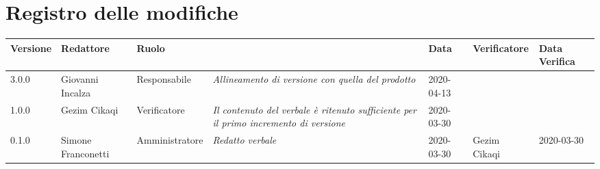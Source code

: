 \section*{Registro delle modifiche}
\renewcommand{\arraystretch}{1.8}

  \setlength\LTleft{-1.7cm}
  \begin{longtable}{|p{1.7cm}|p{2cm}|p{2.5cm}|p{3cm}|p{1.7cm}|p{2cm}|p{2.3cm}|}
    \hline

    \rowcolor{header}
    \textbf{Versione} & \textbf{Redattore} & \textbf{Ruolo} & \centering{\textbf{Descrizione}} & \textbf{Data} & \textbf{Verificatore} & \textbf{Data Verifica}\\

    \hline
    3.0.0 & Giovanni Incalza & Responsabile & \small{\textit{Allineamento di versione con quella del prodotto}} & 2020-04-13 & &\\
    1.0.0 & Gezim Cikaqi & Verificatore & \small{\textit{Il contenuto del verbale è ritenuto sufficiente per il primo incremento di versione}} & 2020-03-30 & &\\
	0.1.0 & Simone Franconetti & Amministratore & \small{\textit{Redatto verbale}} & 2020-03-30 & Gezim Cikaqi & 2020-03-30 \\
    \hline
  \end{longtable}
  \setlength\LTleft{0cm}
